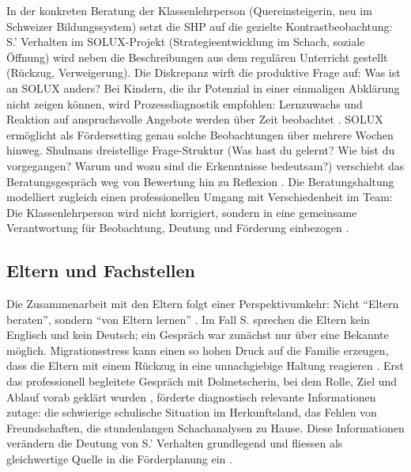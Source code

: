 \documentclass[ngerman, a4paper]{article}
\begin{document}
In der konkreten Beratung der Klassenlehrperson (Quereinsteigerin, neu im
Schweizer Bildungssystem) setzt die SHP auf die gezielte Kontrastbeobachtung:
S.' Verhalten im SOLUX-Projekt (Strategieentwicklung im Schach, soziale Öffnung)
wird neben die Beschreibungen aus dem regulären Unterricht gestellt (Rückzug,
Verweigerung). Die Diskrepanz wirft die produktive Frage auf: Was ist an SOLUX
anders? Bei Kindern, die ihr Potenzial in einer einmaligen Abklärung nicht zeigen
können, wird Prozessdiagnostik empfohlen: Lernzuwachs und Reaktion auf
anspruchsvolle Angebote werden über Zeit beobachtet
\parencite[vgl.][S.\,244\psq]{gauckreimann2021psychdiagnostik}. SOLUX ermöglicht
als Fördersetting genau solche Beobachtungen über mehrere Wochen hinweg. Shulmans
dreistellige Frage-Struktur (Was hast du gelernt? Wie bist du vorgegangen? Warum
und wozu sind die Erkenntnisse bedeutsam?) verschiebt das Beratungsgespräch weg
von Bewertung hin zu Reflexion
\parencite[vgl.][S.\,386\psq]{muelleroppliger2021adaptive}. Die
Beratungshaltung modelliert zugleich einen professionellen Umgang mit
Verschiedenheit im Team: Die Klassenlehrperson wird nicht korrigiert, sondern
in eine gemeinsame Verantwortung für Beobachtung, Deutung und Förderung
einbezogen
\parencite[vgl.][S.\,308\psq]{widmerwolf2018multiprofessionell}.

\subsection{Eltern und Fachstellen}

Die Zusammenarbeit mit den Eltern folgt einer Perspektivumkehr: Nicht
\enquote{Eltern beraten}, sondern \enquote{von Eltern lernen}
\parencite[vgl.][S.\,14\psq]{kosoroklabhart2021voneltern}. Im Fall S. sprechen
die Eltern kein Englisch und kein Deutsch; ein Gespräch war zunächst nur über eine
Bekannte möglich. Migrationsstress kann einen so hohen Druck auf die Familie
erzeugen, dass die Eltern mit einem Rückzug in eine unnachgiebige Haltung reagieren
\parencite[vgl.][S.\,15]{kosoroklabhart2021voneltern}. Erst das professionell
begleitete Gespräch mit Dolmetscherin, bei dem Rolle, Ziel und Ablauf vorab
geklärt wurden \parencite[vgl.][S.\,39]{kosoroklabhart2021voneltern}, förderte
diagnostisch relevante Informationen zutage: die schwierige schulische Situation
im Herkunftsland, das Fehlen von Freundschaften, die stundenlangen Schachanalysen
zu Hause. Diese Informationen verändern die Deutung von S.' Verhalten grundlegend
und fliessen als gleichwertige Quelle in die Förderplanung ein
\parencite[vgl.][S.\,160]{kummerwyss2017kooperativunterrichten}.
\end{document}
